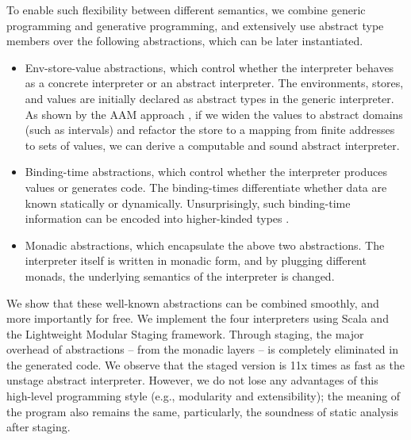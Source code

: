To enable such flexibility between different semantics, we combine generic
programming and generative programming, and extensively use abstract type
members over the following abstractions, which can be later instantiated.

\begin{itemize}
\item Env-store-value abstractions, which control whether the interpreter
  behaves as a concrete interpreter or an abstract interpreter.
  The environments, stores, and values are initially declared as abstract types in the generic interpreter.
  As shown by the AAM approach \cite{DBLP:journals/jfp/HornM12,
  DBLP:conf/icfp/HornM10}, if we widen the values to abstract domains (such as
  intervals) and refactor the store to a mapping from finite addresses to sets of
  values, we can derive a computable and sound abstract interpreter.
\item Binding-time abstractions, which control whether the interpreter produces
  values or generates code. The binding-times differentiate whether data are 
  known statically or dynamically. Unsurprisingly, such binding-time
  information can be encoded into higher-kinded types 
    \cite{DBLP:journals/jfp/CaretteKS09, Ofenbeck:2017:SGP:3136040.3136060}.
\item Monadic abstractions, which encapsulate the above two abstractions.
  The interpreter itself is written in monadic form, and by plugging different monads, 
  the underlying semantics of the interpreter is changed.
\end{itemize}


We show that these well-known abstractions can be combined smoothly, and more
importantly for free. We implement the four interpreters using Scala and the
Lightweight Modular Staging \cite{DBLP:conf/gpce/RompfO10} framework. Through
staging, the major overhead of abstractions -- from the monadic layers -- is
completely eliminated in the generated code. We observe that the staged version is 
11x times as fast as the unstage abstract interpreter. 
However, we do not lose any advantages of this high-level programming style 
(e.g., modularity and extensibility); the meaning of the program also remains 
the same, particularly, the soundness of static analysis after staging.

